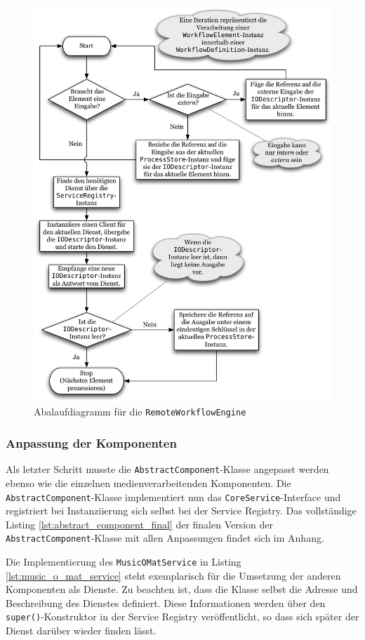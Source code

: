   \begin{figure}[!ht]
    \centering
      \includegraphics[width=.7\textwidth]{images/WorkflowEngine_Flowchart.pdf}
    \caption{Abalaufdiagramm für die \texttt{RemoteWorkflowEngine}}
    \label{fig:images_WorkflowEngine_Flowchart}
  \end{figure}


\subsubsection{Anpassung der Komponenten} %
\label{ssub:anpassung_der_komponenten}

  Als letzter Schritt musste die \verb!AbstractComponent!-Klasse angepasst werden ebenso wie die einzelnen medienverarbeitenden Komponenten. Die \verb!AbstractComponent!-Klasse implementiert nun das \verb!CoreService!-Interface und registriert bei Instanziierung sich selbst bei der Service Registry. Das vollständige Listing \ref{lst:abstract_component_final} der finalen Version der \verb!AbstractComponent!-Klasse mit allen Anpassungen findet sich im Anhang.
  
  Die Implementierung des \verb!MusicOMatService! in Listing \ref{lst:music_o_mat_service} steht exemplarisch für die Umsetzung der anderen Komponenten als Dienste. Zu beachten ist, dass die Klasse selbst die Adresse und Beschreibung des Dienstes definiert. Diese Informationen werden über den \verb!super()!-Konstruktor in der Service Registry veröffentlicht, so dass sich später der Dienst darüber wieder finden lässt.

